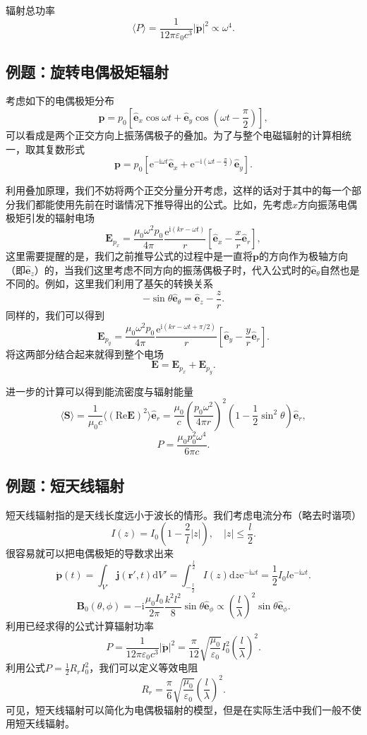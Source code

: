 \documentclass[UTF8]{ctexbook}
\newcommand{\e}{\mathrm{e}}
\renewcommand{\d}{\mathrm{d}}
\renewcommand{\b}{\boldsymbol}
\renewcommand{\i}{\mathrm{i}}
\renewcommand{\Re}{\mathrm{Re}}
\numberwithin{equation}{chapter}
\begin{document}
	辐射总功率
	\[\langle P\rangle=\frac{1}{12\pi\varepsilon_0c^3}|\ddot{\b{p}}|^2\propto \omega^4.\]
	
	\subsection{例题：旋转电偶极矩辐射}
	考虑如下的电偶极矩分布
	\[\b{p}=p_0\left[\hat{\b{e}}_x\cos\omega t+\hat{\b{e}}_y\cos\left(\omega t-\frac{\pi}{2}\right)\right],\]
	可以看成是两个正交方向上振荡偶极子的叠加。为了与整个电磁辐射的计算相统一，取其复数形式
	\[\b{p}=p_0\left[\e^{-\i\omega t}\hat{\b{e}}_x+\e^{-\i\left(\omega t-\frac{\pi}{2}\right)}\hat{\b{e}}_y\right].\]
	
	利用叠加原理，我们不妨将两个正交分量分开考虑，这样的话对于其中的每一个部分我们都能使用先前在时谐情况下推导得出的公式。比如，先考虑$x$方向振荡电偶极矩引发的辐射电场
	\[\b{E}_{p_x}=\frac{\mu_0\omega^2p_0}{4\pi}\frac{\e^{\i(kr-\omega t)}}{r}\left[\hat{\b{e}}_x-\frac{x}{r}\hat{\b{e}}_r\right],\]
	这里需要提醒的是，我们之前推导公式的过程中是一直将$\b{p}$的方向作为极轴方向（即$\hat{\b{e}}_z$）的，当我们这里考虑不同方向的振荡偶极子时，代入公式时的$\hat{\b{e}}_\theta$自然也是不同的。例如，这里我们利用了基矢的转换关系
	\[-\sin\theta\hat{\b{e}}_\theta=\hat{\b{e}}_z-\frac{z}{r}.\]
	同样的，我们可以得到
	\[\b{E}_{p_y}=\frac{\mu_0\omega^2p_0}{4\pi}\frac{\e^{\i(kr-\omega t+\pi/2)}}{r}\left[\hat{\b{e}}_y-\frac{y}{r}\hat{\b{e}}_r\right].\]
	将这两部分结合起来就得到整个电场
	\[\b{E}=\b{E}_{p_x}+\b{E}_{p_y}.\]
	
	进一步的计算可以得到能流密度与辐射能量
	\[\langle \b{S}\rangle =\frac{1}{\mu_0c}\langle (\Re \b{E})^2\rangle\hat{\b{e}}_r=\frac{\mu_0}{c}\left(\frac{p_0\omega^2}{4\pi r}\right)^2(1-\frac{1}{2}\sin^2\theta)\hat{\b{e}}_r,\]
	\[P=\frac{\mu_0 p_0^2\omega^4}{6\pi c}.\]
	
	\subsection{例题：短天线辐射}
	短天线辐射指的是天线长度远小于波长的情形。我们考虑电流分布（略去时谐项）
	\[I(z)=I_0\left(1-\frac{2}{l}|z|\right),\quad |z|\leq\frac{l}{2}.\]
	很容易就可以把电偶极矩的导数求出来
	\[\dot{\b{p}}(t)=\int_{V'}\b{j}(\b{r}',t)\d V'=\int_{-\frac{l}{2}}^{\frac{l}{2}}I(z)\d z\e^{-\i\omega t}=\frac{1}{2}I_0l\e^{-\i\omega t}.\]
	\[\b{B}_0(\theta,\phi)=-\i\frac{\mu_0I_0}{2\pi}\frac{k^2 l^2}{8}\sin\theta\hat{\b{e}}_\phi\propto \left(\frac{l}{\lambda}\right)^2\sin\theta\hat{\b{e}}_\phi.\]
	利用已经求得的公式计算辐射功率
	\[P=\frac{1}{12\pi\varepsilon_0c^3}|\ddot{\b{p}}|^2=\frac{\pi}{12}\sqrt{\frac{\mu_0}{\varepsilon_0}}I_0^2\left(\frac{l}{\lambda}\right)^2.\]
	利用公式$P=\frac{1}{2}R_rI_0^2$，我们可以定义等效电阻
	\[R_r=\frac{\pi}{6}\sqrt{\frac{\mu_0}{\varepsilon_0}}\left(\frac{l}{\lambda}\right)^2.\]
	可见，短天线辐射可以简化为电偶极辐射的模型，但是在实际生活中我们一般不使用短天线辐射。
	
\end{document}
